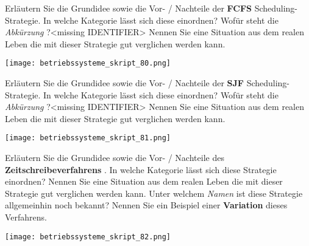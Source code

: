 \documentclass{article}
\begin{document}
\begin{tcolorbox}[colback=white!10!white,colframe=lightgray!75!black,
  savelowerto=\jobname_ex.tex,breakable,enhanced,lines before break=40]

\begin{center}
Erläutern Sie die Grundidee sowie die Vor- / Nachteile der 
\textbf{FCFS
} Scheduling-Strategie. In welche Kategorie lässt sich diese einordnen? Wofür steht die 
\textit{Abkürzung
}?<missing IDENTIFIER>
Nennen Sie eine Situation aus dem realen Leben die mit dieser Strategie gut verglichen werden kann.

\end{center}

\tcblower

\justifying
\texttt{[image: betriebssysteme\_skript\_80.png]}

\end{tcolorbox}
\begin{tcolorbox}[colback=white!10!white,colframe=lightgray!75!black,
  savelowerto=\jobname_ex.tex,breakable,enhanced,lines before break=40]

\begin{center}
Erläutern Sie die Grundidee sowie die Vor- / Nachteile der 
\textbf{SJF
} Scheduling-Strategie. In welche Kategorie lässt sich diese einordnen? Wofür steht die 
\textit{Abkürzung
}?<missing IDENTIFIER>
Nennen Sie eine Situation aus dem realen Leben die mit dieser Strategie gut verglichen werden kann.

\end{center}

\tcblower

\justifying
\texttt{[image: betriebssysteme\_skript\_81.png]}

\end{tcolorbox}
\begin{tcolorbox}[colback=white!10!white,colframe=lightgray!75!black,
  savelowerto=\jobname_ex.tex,breakable,enhanced,lines before break=40]

\begin{center}
Erläutern Sie die Grundidee sowie die Vor- / Nachteile des 
\textbf{Zeitschreibeverfahrens
}. In welche Kategorie lässt sich diese Strategie einordnen?
Nennen Sie eine Situation aus dem realen Leben die mit dieser Strategie gut verglichen werden kann.
Unter welchem 
\textit{Namen
} ist diese Strategie allgemeinhin noch bekannt?
Nennen Sie ein Beispiel einer 
\textbf{Variation
} dieses Verfahrens.

\end{center}

\tcblower

\justifying
\texttt{[image: betriebssysteme\_skript\_82.png]}

\end{tcolorbox}
\end{document}
